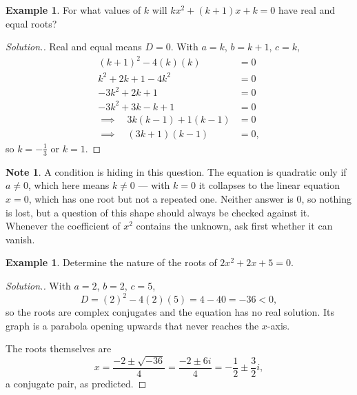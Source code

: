 \documentclass[11pt,a4paper]{article}
\theoremstyle{definition}
\newtheorem{example}[thm]{Example}
\newtheorem{note}[thm]{Note}
\newenvironment{solution}
  {\renewcommand{\qedsymbol}{}\begin{proof}[\textit{Solution}.]}
  {\end{proof}}
\begin{document}
\begin{example}
For what values of $k$ will $kx^{2}+(k+1)x+k=0$ have real and equal roots?
\end{example}

\begin{solution}
Real and equal means $D=0$. With $a=k$, $b=k+1$, $c=k$,
\begin{align*}
(k+1)^{2}-4(k)(k) & = 0\\
k^{2}+2k+1-4k^{2} & = 0\\
-3k^{2}+2k+1 & = 0\\
-3k^{2}+3k-k+1 & = 0\\
\implies \quad  3k(k-1)+1(k-1) & = 0\\
\implies \quad  (3k+1)(k-1) & = 0,
\end{align*}
so $k=-\frac{1}{3}$ or $k=1$.
\end{solution}

\begin{note}
A condition is hiding in this question. The equation is quadratic only if $a\neq 0$,
which here means $k\neq 0$ --- with $k=0$ it collapses to the linear equation $x=0$,
which has one root but not a repeated one. Neither answer is $0$, so nothing is
lost, but a question of this shape should always be checked against it. Whenever the
coefficient of $x^{2}$ contains the unknown, ask first whether it can vanish.
\end{note}

\begin{example}
Determine the nature of the roots of $2x^{2}+2x+5=0$.
\end{example}

\begin{solution}
With $a=2$, $b=2$, $c=5$,
$$D=(2)^{2}-4(2)(5)=4-40=-36<0 ,$$
so the roots are complex conjugates and the equation has no real solution. Its
graph is a parabola opening upwards that never reaches the $x$-axis.

The roots themselves are
$$x=\frac{-2\pm\sqrt{-36}}{4}=\frac{-2\pm 6i}{4}=-\frac{1}{2}\pm\frac{3}{2}i ,$$
a conjugate pair, as predicted.
\end{solution}
\end{document}
